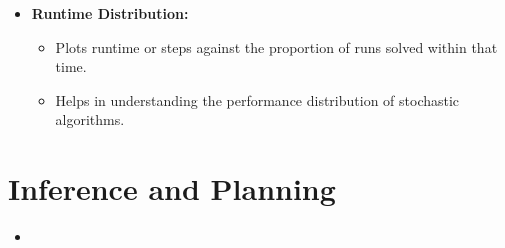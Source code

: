 \documentclass{article}
\theoremstyle{note}
\begin{document}
\begin{itemize}
  \item \textbf{Runtime Distribution:}
  \begin{itemize}
    \item Plots runtime or steps against the proportion of runs solved within that time.
    \item Helps in understanding the performance distribution of stochastic algorithms.
  \end{itemize}
   	
  \end{itemize}
  
  \section{Inference and Planning}
  	
  \begin{itemize}
  	\item 
  \end{itemize}
  


 
\end{document}
